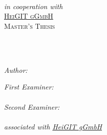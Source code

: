 \documentclass[
11pt, %
oneside, %
english, %
onehalfspacing, %
nolistspacing, %
liststotoc, %
parskip, %
headsepline, %
]{MastersDoctoralThesis} %
\author{Nikolaos \textsc{Kolaxidis}} %
\begin{document}
\frontmatter %

\pagestyle{plain} %


\begin{titlepage}
\begin{center}

{\color{hd-red} %
\textsc{\large 
    \univname\\[.4cm] %
    \deptname\\ %
    \facname
}}\\[.4cm] %
\emph{in cooperation with}\\[.4cm]
{\color{hd-red}
    \textsc{\href{https://heigit.org}{HeiGIT gGmbH}
}}\\[1.2cm]
\textsc{\LARGE Master's Thesis}\\[.8cm] %

\HRule \\ %
\vspace{.4cm}
\begin{adjustwidth}{-0.5em}{-0.5em}
    \centering
    {\huge \bfseries \ttitle \par} %
\end{adjustwidth}
\vspace{.4cm}
\HRule \\[1.2cm] %
 
\begin{minipage}[t]{.4\textwidth}
\begin{flushleft} \large
\emph{Author:}\\
{\color{hd-red}{\authorname}}
\end{flushleft}
\end{minipage}
\begin{minipage}[t]{.4\textwidth}
\begin{flushright} \large
\emph{First Examiner:} \\
{\color{hd-red}{\supname}} \\
\vspace{.4cm}
\emph{Second Examiner:}\\
{\color{hd-red}
    {\examname} \\
    \emph{associated with \href{https://heigit.org}{HeiGIT gGmbH}}
} \\


\end{flushright}
\end{minipage}
\end{center}
\end{titlepage}
\end{document}
